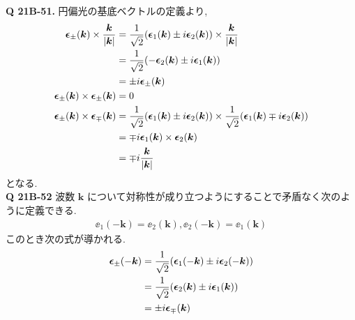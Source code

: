 \documentclass[uplatex,dvipdfmx,a4paper,11pt]{jlreq}
\newcommand{\kk}{\bm{k}}
\theoremstyle{definition}
\begin{document}
\textbf{Q 21B-51.}
円偏光の基底ベクトルの定義より,
\begin{align}
  \ee_\pm(\kk)\times\frac{\kk}{|\kk|}
   & = \frac{1}{\sqrt{2}}\qty(\ee_1(\kk) \pm i\ee_2(\kk))\times\frac{\kk}{|\kk|}                                  \\
   & = \frac{1}{\sqrt{2}}\qty(-\ee_2(\kk) \pm i\ee_1(\kk))                                                        \\
   & = \pm i\ee_\pm(\kk)                                                                                          \\
  \ee_\pm(\kk)\times\ee_\pm(\kk)
   & = 0                                                                                                          \\
  \ee_\pm(\kk)\times\ee_\mp(\kk)
   & = \frac{1}{\sqrt{2}}\qty(\ee_1(\kk) \pm i\ee_2(\kk))\times\frac{1}{\sqrt{2}}\qty(\ee_1(\kk) \mp i\ee_2(\kk)) \\
   & = \mp i\ee_1(\kk)\times\ee_2(\kk)                                                                            \\
   & = \mp i\frac{\kk}{|\kk|}
\end{align}
となる. \\

\textbf{Q 21B-52}
波数 $\kk$ について対称性が成り立つようにすることで矛盾なく次のように定義できる.
\begin{align}
  \ee_1(-\kk) = \ee_2(\kk), \ee_2(-\kk) = \ee_1(\kk)
\end{align}
このとき次の式が導かれる.
\begin{align}
  \ee_\pm(-\kk) & = \frac{1}{\sqrt{2}}\qty(\ee_1(-\kk)\pm i\ee_2(-\kk)) \\
                & = \frac{1}{\sqrt{2}}\qty(\ee_2(\kk)\pm i\ee_1(\kk))   \\
                & = \pm i\ee_\mp(\kk)
\end{align}
\end{document}
